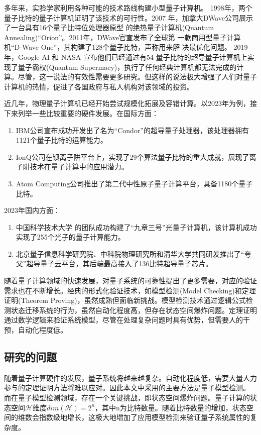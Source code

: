 多年来，实验学家利用各种可能的技术路线构建小型量子计算机。 1998年，两个量子比特的量子计算机证明了该技术的可行性\citep{chuang1998experimental}。2007
年，加拿大DWave公司展示了一台具有16个量子比特位处理器原型
的绝热量子计算机(Quantum Annealing)“Orion”。2011年，DWave官宣发布了全球第
一款商用型量子计算机“D-Wave One”，其构建了128个量子比特，声称用来解
决最优化问题。
2019 年，Google AI 和 NASA 宣布他们已经通过有54 量子比特的超导量子计算机上实现了量子霸权(Quantum Supermacy)，执行了任何经典计算机都无法完成的计算\citep{arute2019quantum}。尽管，这一说法的有效性需要更多研究\citep{pednault2019quantum}。但这样的说法极大增强了人们对量子计算机的热情，促进了各国政府与私人机构对该领域的投资。

近几年，物理量子计算机已经开始尝试规模化拓展及容错计算。以2023年为例，接下来列举一些比较重要的硬件发展。在国际方面：
\begin{enumerate}
    \item IBM公司宣布成功开发出了名为“Condor”的超导量子处理器，该处理器拥有1121个量子比特的运算能力。
    \item IonQ公司在钡离子阱平台上，实现了29个算法量子比特的重大成就，展现了离子阱技术在量子计算中的应用潜力。
    \item Atom Computing公司推出了第二代中性原子量子计算平台，具备1180个量子比特。
\end{enumerate}
2023年国内方面：
\begin{enumerate}
    \item 中国科学技术大学 的团队成功构建了“九章三号”光量子计算机，该计算机成功实现了255个光子的量子计算能力。
    \item 北京量子信息科学研究院、中科院物理研究所和清华大学共同研发推出了“夸父”超导量子云平台，其后端最高接入了136比特超导量子芯片。
\end{enumerate}

随着量子计算领域的快速发展，对量子系统的可靠性提出了更多需要，对应的验证需求也在不断增长。经典的形式化验证技术，如模型检测(Model Checking)和定理证明(Theorem Proving)，虽然成熟但面临新挑战。模型检测技术通过逻辑公式检测状态迁移系统的行为，虽然自动化程度高，但存在状态空间爆炸问题。定理证明通过数学逻辑来验证系统模型，尽管在处理复杂问题时具有优势，但需要人的干预，自动化程度低。
\subsection{研究的问题}
随着量子计算硬件的发展，量子系统将越来越复杂。自动化程度低，需要大量人力参与的定理证明方法将难以应对。因此本文中采用的主要方法是量子模型检测。
而在量子模型检测领域，存在一个关键挑战，即状态空间爆炸问题。量子计算的状态空间\(\mathcal{H}\)维度\(dim\left(\mathcal{H}\right)=2^n\)，其中n为比特数量。随着比特数量的增加，状态空间的维数会指数级地增长，这极大地增加了应用模型检测来验证量子系统属性的复杂度。

